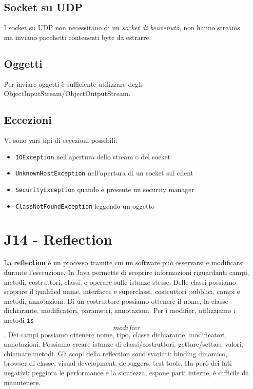 \documentclass[11pt]{article}
\newcommand{\code}[1]{\texttt{#1}}
\begin{document}
\subsection{Socket su UDP}
I socket su UDP non necessitano di un \textit{socket di benvenuto}, non hanno streams ma inviano pacchetti contenenti byte da estrarre. 
\subsection{Oggetti}
Per inviare oggetti è sufficiente utilizzare degli ObjectInputStream/ObjectOutputStream. 
\subsection{Eccezioni}
Vi sono vari tipi di eccezioni possibili:
\begin{itemize}
    \item \code{IOException} nell'apertura dello stream o del socket 
    \item \code{UnknownHostException} nell'apertura di un socket sul client 
    \item \code{SecurityException} quando è presente un security manager
    \item \code{ClassNotFoundException} leggendo un oggetto
\end{itemize}
\section{J14 - Reflection}
La \textbf{reflection} è un processo tramite cui un software può osservarsi e modificarsi durante l'esecuzione. In Java permette di scoprire informazioni riguardanti campi, metodi, costruttori, classi, e operare sulle istanze stesse.
Delle classi possiamo scoprire il qualified name, interfacce e superclassi, costruttori pubblici, campi e metodi, annotazioni. Di un costruttore possiamo ottenere il nome, la classe dichiarante, modificatori, parametri, annotazioni. Per i modifier, utilizziamo i metodi \code{is\[modifier\]}. Dei campi possiamo ottenere nome, tipo, classe dichiarante, modificatori, annotazioni. Possiamo creare istanze di classi/costruttori, gettare/settare valori, chiamare metodi. Gli scopi della reflection sono svariati: binding dinamico, browser di classe, visual development, debuggers, test tools. Ha però dei lati negativi: peggiora le performance e la sicurezza, espone parti interne, è difficile da manutenere.

\printglossary
\end{document}
